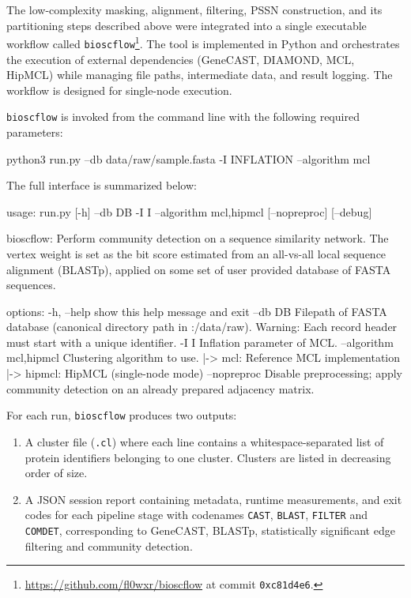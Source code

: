 The low-complexity masking, alignment, filtering, PSSN construction, and its
partitioning steps described above were integrated into a single executable
workflow called
\texttt{bioscflow}\footnote{\url{https://github.com/fl0wxr/bioscflow} at commit \texttt{0xc81d4e6}.}. The
tool is implemented in Python and orchestrates the execution of external
dependencies (GeneCAST, DIAMOND, MCL, HipMCL) while managing file paths,
intermediate data, and result logging. The workflow is designed for single-node
execution.

\texttt{bioscflow} is invoked from the command line with the following required parameters:

\begin{plaintext}[numbers=none]
python3 run.py --db data/raw/sample.fasta -I INFLATION --algorithm mcl
\end{plaintext}

The full interface is summarized below:

\begin{plaintext}
usage: run.py [-h] --db DB -I I --algorithm {mcl,hipmcl} [--nopreproc] [--debug]

bioscflow: Perform community detection on a sequence similarity network. The vertex weight is set as the bit score estimated from an all-vs-all local sequence alignment (BLASTp), applied on some set of user provided database of FASTA sequences.

options:
  -h, --help            show this help message and exit
  --db DB               Filepath of FASTA database (canonical directory path in
                        :/data/raw).
                        Warning: Each record header must start with a unique
                        identifier.
  -I I                  Inflation parameter of MCL.
  --algorithm {mcl,hipmcl}
                        Clustering algorithm to use.
                        |-> mcl: Reference MCL implementation
                        |-> hipmcl: HipMCL (single-node mode)
  --nopreproc           Disable preprocessing; apply community detection on an
                        already prepared adjacency matrix.
\end{plaintext}

For each run, \texttt{bioscflow} produces two outputs:

\begin{enumerate}
  \item A cluster file (\texttt{.cl}) where each line contains a whitespace-separated list of protein identifiers belonging to one cluster. Clusters are listed in decreasing order of size.
  \item A JSON session report containing metadata, runtime measurements, and exit codes for each pipeline stage with codenames \texttt{CAST}, \texttt{BLAST}, \texttt{FILTER} and \texttt{COMDET}, corresponding to GeneCAST, BLASTp, statistically significant edge filtering and community detection.
\end{enumerate}

